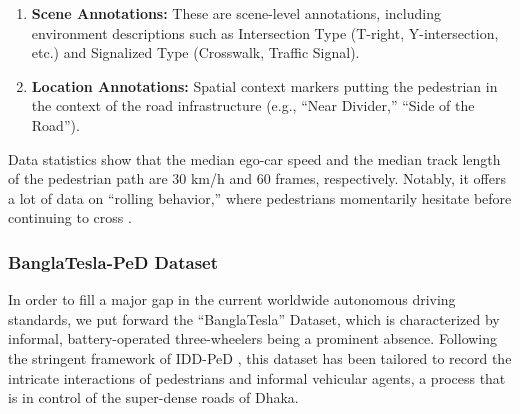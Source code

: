 \documentclass[12pt, a4paper]{article}
\begin{document}
\begin{itemize}
\begin{enumerate}
        \item \textbf{Scene Annotations:} These are scene-level annotations, including environment descriptions such as Intersection Type (T-right, Y-intersection, etc.) and Signalized Type (Crosswalk, Traffic Signal).
        \item \textbf{Location Annotations:} Spatial context markers putting the pedestrian in the context of the road infrastructure (e.g., ``Near Divider,'' ``Side of the Road'').
     \end{enumerate}
\end{itemize}
Data statistics show that the median ego-car speed and the median track length of the pedestrian path are 30 km/h and 60 frames, respectively. Notably, it offers a lot of data on ``rolling behavior,'' where pedestrians momentarily hesitate before continuing to cross \cite{bokkasam2025pedestrian}.

\subsubsection{BanglaTesla-PeD Dataset}
In order to fill a major gap in the current worldwide autonomous driving standards, we put forward the ``BanglaTesla'' Dataset, which is characterized by informal, battery-operated three-wheelers being a prominent absence. Following the stringent framework of IDD-PeD \cite{bokkasam2025pedestrian}, this dataset has been tailored to record the intricate interactions of pedestrians and informal vehicular agents, a process that is in control of the super-dense roads of Dhaka.
\end{document}
